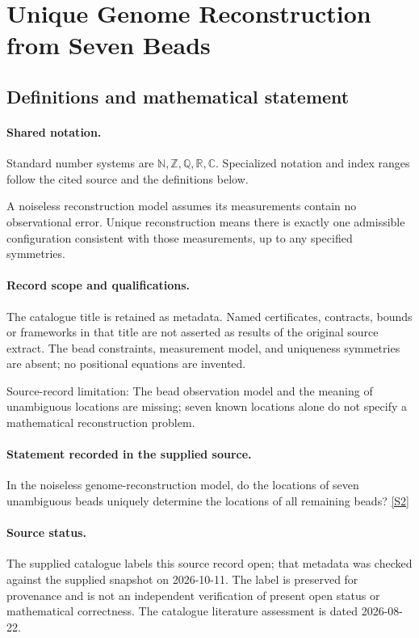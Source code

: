\documentclass[11pt]{article}
\newcommand{\sref}[2]{\hyperlink{source:#1:#2}{[S#2]}}
\begin{document}
\section{Unique Genome Reconstruction from Seven Beads}\label{statement}

\subsection{Definitions and mathematical statement}

\paragraph{Shared notation.}Standard number systems are $\mathbb N,\mathbb Z,\mathbb Q,\mathbb R,\mathbb C$. Specialized notation and index ranges follow the cited source and the definitions below.


A noiseless reconstruction model assumes its measurements contain no observational error. Unique reconstruction means there is exactly one admissible configuration consistent with those measurements, up to any specified symmetries.
\paragraph{Record scope and qualifications.}
The catalogue title is retained as metadata. Named certificates, contracts, bounds or frameworks in that title are not asserted as results of the original source extract.
The bead constraints, measurement model, and uniqueness symmetries are absent; no positional equations are invented.

Source-record limitation: The bead observation model and the meaning of unambiguous locations are missing; seven known locations alone do not specify a mathematical reconstruction problem.
\paragraph{Statement recorded in the supplied source.}
In the noiseless genome-reconstruction model, do the locations of seven unambiguous beads uniquely determine the locations of all remaining beads? \sref{statement}{2}
\paragraph{Source status.}
The supplied catalogue labels this source record open; that metadata was checked against the supplied snapshot on 2026-10-11. The label is preserved for provenance and is not an independent verification of present open status or mathematical correctness. The catalogue literature assessment is dated 2026-08-22.
\end{document}
